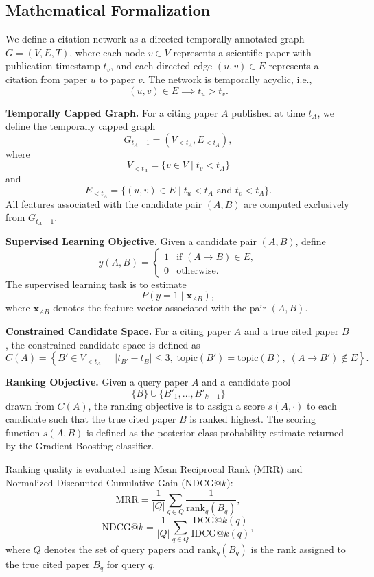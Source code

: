 \documentclass[11pt,a4paper]{article}
\begin{document}
\subsection{Mathematical Formalization}

We define a citation network as a directed temporally annotated graph \(G = (V,E,T)\), where each node \(v \in V\) represents a scientific paper with publication timestamp \(t_v\), and each directed edge \((u,v) \in E\) represents a citation from paper \(u\) to paper \(v\). The network is temporally acyclic, i.e.,
\[
(u,v) \in E \implies t_u > t_v.
\]

\textbf{Temporally Capped Graph.}
For a citing paper \(A\) published at time \(t_A\), we define the temporally capped graph
\[
G_{t_A-1} = (V_{<t_A}, E_{<t_A}),
\]
where
\[
V_{<t_A} = \{v \in V \mid t_v < t_A\}
\]
and
\[
E_{<t_A} = \{(u,v) \in E \mid t_u < t_A \text{ and } t_v < t_A\}.
\]
All features associated with the candidate pair \((A,B)\) are computed exclusively from \(G_{t_A-1}\).

\textbf{Supervised Learning Objective.}
Given a candidate pair \((A,B)\), define
\[
y(A,B)=
\begin{cases}
1 & \text{if } (A \to B)\in E,\\
0 & \text{otherwise}.
\end{cases}
\]
The supervised learning task is to estimate
\[
P\!\left(y=1 \mid \mathbf{x}_{AB}\right),
\]
where \(\mathbf{x}_{AB}\) denotes the feature vector associated with the pair \((A,B)\).

\textbf{Constrained Candidate Space.}
For a citing paper \(A\) and a true cited paper \(B\), the constrained candidate space is defined as
\[
C(A)=
\left\{
B' \in V_{<t_A}
\;\middle|\;
|t_{B'}-t_B| \le 3,\;
\mathrm{topic}(B')=\mathrm{topic}(B),\;
(A \to B') \notin E
\right\}.
\]

\textbf{Ranking Objective.}
Given a query paper \(A\) and a candidate pool
\[
\{B\} \cup \{B'_1,\ldots,B'_{k-1}\}
\]
drawn from \(C(A)\), the ranking objective is to assign a score \(s(A,\cdot)\) to each candidate such that the true cited paper \(B\) is ranked highest. The scoring function \(s(A,B)\) is defined as the posterior class-probability estimate returned by the Gradient Boosting classifier.

Ranking quality is evaluated using Mean Reciprocal Rank (MRR) and Normalized Discounted Cumulative Gain (NDCG@\(k\)):
\[
\mathrm{MRR}
=
\frac{1}{|Q|}
\sum_{q \in Q}
\frac{1}{\mathrm{rank}_q(B_q)},
\]
\[
\mathrm{NDCG@}k
=
\frac{1}{|Q|}
\sum_{q \in Q}
\frac{\mathrm{DCG@}k(q)}
{\mathrm{IDCG@}k(q)},
\]
where \(Q\) denotes the set of query papers and \(\mathrm{rank}_q(B_q)\) is the rank assigned to the true cited paper \(B_q\) for query \(q\).
\end{document}
